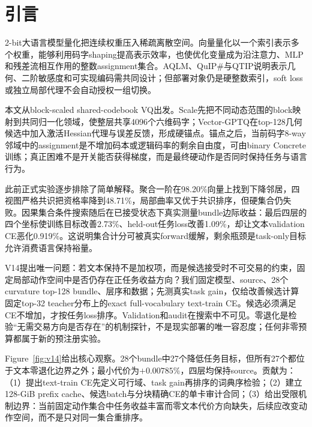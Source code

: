 \section{引言}

2-bit大语言模型量化把连续权重压入稀疏离散空间。向量量化以一个索引表示多个权重，能够利用码字shaping提高表示效率，也使优化变量成为沿注意力、MLP和残差流相互作用的整数assignment集合。AQLM、QuIP\#与QTIP说明表示几何、二阶敏感度和可实现编码需共同设计\cite{aqlm,quipsharp,qtip}；但部署对象仍是硬整数索引，soft loss或独立局部代理不会自动授权一组切换。

本文从block-scaled shared-codebook VQ出发。Scale先把不同动态范围的block映射到共同归一化领域，使整层共享4096个六维码字；Vector-GPTQ在top-128几何候选中加入激活Hessian代理与误差反馈，形成硬锚点。锚点之后，当前码字8-way邻域中的assignment是不增加码本或逻辑码率的剩余自由度，可由binary Concrete训练；真正困难不是开关能否获得梯度，而是最终硬动作是否同时保持任务与语言行为。

此前正式实验逐步排除了简单解释。聚合一阶在98.20\%向量上找到下降邻居，四视图严格共识把资格率降到48.71\%，局部曲率又优于共识排序，但硬集合仍失败。因果集合条件搜索随后在已接受状态下真实测量bundle边际收益：最后四层的四个坐标使训练目标改善2.73\%、held-out任务loss改善1.09\%，却让文本validation CE恶化0.919\%。这说明集合计分可被真实forward缓解，剩余瓶颈是task-only目标允许消费语言保持裕量。

V14提出唯一问题：若文本保持不是加权项，而是候选接受时不可交易的约束，固定局部动作空间中是否仍存在正任务收益方向？我们固定模型、source、28个curvature top-128 bundle、层序和数据；先测真实task gain，仅给改善候选计算固定top-32 teacher分布上的exact full-vocabulary text-train CE。候选必须满足CE不增加，才按任务loss排序。Validation和audit在搜索中不可见。零退化是检验“无需交易方向是否存在”的机制探针，不是现实部署的唯一容忍度；任何非零预算都属于新的预注册实验。

Figure~\ref{fig:v14}给出核心观察。28个bundle中27个降低任务目标，但所有27个都位于文本零退化边界之外；最小代价为$+0.00785\%$，四层均保持source。贡献为：（1）提出text-train CE先定义可行域、task gain再排序的词典序检验；（2）建立128-GiB prefix cache、候选batch与分块精确CE的单卡审计合同；（3）给出受限机制边界：当前固定动作集合中任务收益丰富而零文本代价方向缺失，后续应改变动作空间，而不是只对同一集合重排序。
